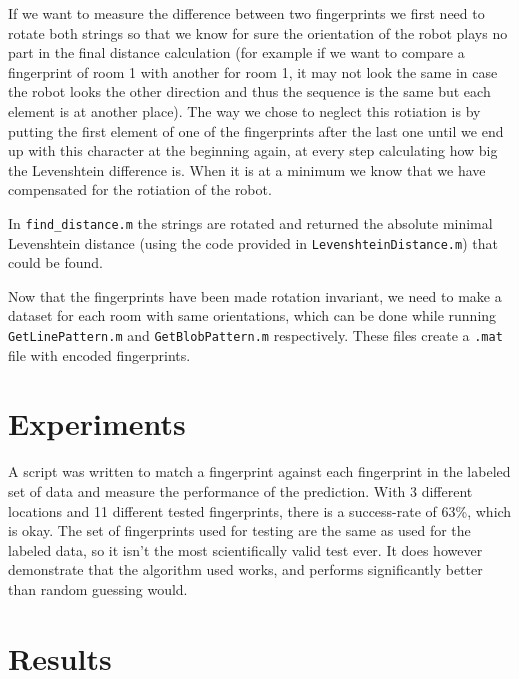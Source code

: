 \documentclass[a4paper, 20pt]{article}
\begin{document}
If we want to measure the difference between two fingerprints we first need to
rotate both strings so that we know for sure the orientation of the robot plays
no part in the final distance calculation (for example if we want to compare a
fingerprint of room 1 with another for room 1, it may not look the same in case
the robot looks the other direction and thus the sequence is the same but each
element is at another place). The way we chose to neglect this rotiation is by
putting the first element of one of the fingerprints after the last one until we
end up with this character at the beginning again, at every step calculating how
big the Levenshtein difference is. When it is at a minimum we know that we have
compensated for the rotiation of the robot.

In \texttt{find\_distance.m} the strings are rotated and returned the absolute minimal
Levenshtein distance (using the code provided in \texttt{LevenshteinDistance.m}) that could be found.

Now that the fingerprints have been made rotation invariant, we need to make a
dataset for each room with same orientations, which can be done while running
\texttt{GetLinePattern.m} and \texttt{GetBlobPattern.m} respectively. These
files create a \texttt{.mat} file with encoded fingerprints.



\section{Experiments}
A script was written to match a fingerprint against each fingerprint in the
labeled set of data and measure the performance of the prediction. With 3
different locations and 11 different tested fingerprints, there is a
success-rate of 63\%, which is okay. The set of fingerprints used for testing
are the same as used for the labeled data, so it isn't the most scientifically
valid test ever. It does however demonstrate that the algorithm used works, and
performs significantly better than random guessing would.


\section{Results}
\end{document}
